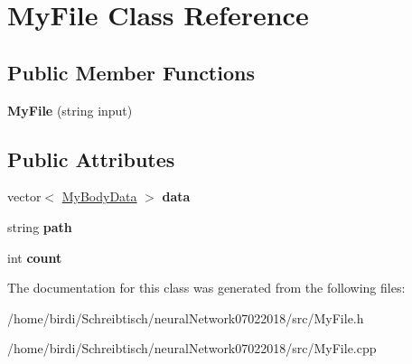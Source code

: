 \hypertarget{classMyFile}{}\section{My\+File Class Reference}
\label{classMyFile}
\subsection*{Public Member Functions}
\begin{DoxyCompactItemize}
\item 
\mbox{\label{classMyFile_a1d7ba38ad78e5d5a173ef4635126f599}} 
{\bfseries My\+File} (string input)
\end{DoxyCompactItemize}
\subsection*{Public Attributes}
\begin{DoxyCompactItemize}
\item 
\mbox{\label{classMyFile_ac1137bec8c966a67467af08d8bdde25b}} 
vector$<$ \mbox{\hyperlink{classMyBodyData}{My\+Body\+Data}} $>$ {\bfseries data}
\item 
\mbox{\label{classMyFile_aef3ed477913209bb5f1cac4c7b26f6ab}} 
string {\bfseries path}
\item 
\mbox{\label{classMyFile_a0aa42658709650b9bc6d55f6efbfad47}} 
int {\bfseries count}
\end{DoxyCompactItemize}


The documentation for this class was generated from the following files\+:\begin{DoxyCompactItemize}
\item 
/home/birdi/\+Schreibtisch/neural\+Network07022018/src/My\+File.\+h\item 
/home/birdi/\+Schreibtisch/neural\+Network07022018/src/My\+File.\+cpp\end{DoxyCompactItemize}

